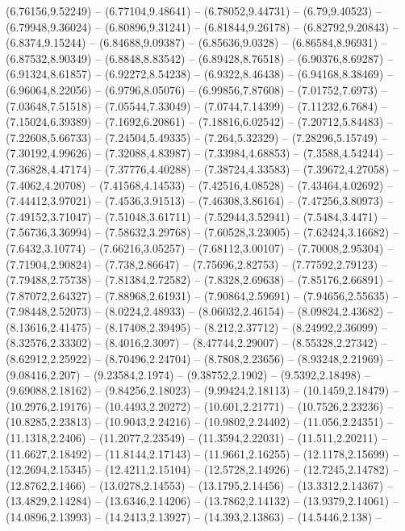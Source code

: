  (6.76156,9.52249) -- (6.77104,9.48641) -- (6.78052,9.44731) -- (6.79,9.40523) -- (6.79948,9.36024) -- (6.80896,9.31241) -- (6.81844,9.26178) -- (6.82792,9.20843) -- (6.8374,9.15244) -- (6.84688,9.09387) -- (6.85636,9.0328) -- (6.86584,8.96931) --
 (6.87532,8.90349) -- (6.8848,8.83542) -- (6.89428,8.76518) -- (6.90376,8.69287) -- (6.91324,8.61857) -- (6.92272,8.54238) -- (6.9322,8.46438) -- (6.94168,8.38469) -- (6.96064,8.22056) -- (6.9796,8.05076) -- (6.99856,7.87608) -- (7.01752,7.6973) --
 (7.03648,7.51518) -- (7.05544,7.33049) -- (7.0744,7.14399) -- (7.11232,6.7684) -- (7.15024,6.39389) -- (7.1692,6.20861) -- (7.18816,6.02542) -- (7.20712,5.84483) -- (7.22608,5.66733) -- (7.24504,5.49335) -- (7.264,5.32329) -- (7.28296,5.15749) --
 (7.30192,4.99626) -- (7.32088,4.83987) -- (7.33984,4.68853) -- (7.3588,4.54244) -- (7.36828,4.47174) -- (7.37776,4.40288) -- (7.38724,4.33583) -- (7.39672,4.27058) -- (7.4062,4.20708) -- (7.41568,4.14533) -- (7.42516,4.08528) -- (7.43464,4.02692) --
 (7.44412,3.97021) -- (7.4536,3.91513) -- (7.46308,3.86164) -- (7.47256,3.80973) -- (7.49152,3.71047) -- (7.51048,3.61711) -- (7.52944,3.52941) -- (7.5484,3.4471) -- (7.56736,3.36994) -- (7.58632,3.29768) -- (7.60528,3.23005) -- (7.62424,3.16682) --
 (7.6432,3.10774) -- (7.66216,3.05257) -- (7.68112,3.00107) -- (7.70008,2.95304) -- (7.71904,2.90824) -- (7.738,2.86647) -- (7.75696,2.82753) -- (7.77592,2.79123) -- (7.79488,2.75738) -- (7.81384,2.72582) -- (7.8328,2.69638) -- (7.85176,2.66891) --
 (7.87072,2.64327) -- (7.88968,2.61931) -- (7.90864,2.59691) -- (7.94656,2.55635) -- (7.98448,2.52073) -- (8.0224,2.48933) -- (8.06032,2.46154) -- (8.09824,2.43682) -- (8.13616,2.41475) -- (8.17408,2.39495) -- (8.212,2.37712) -- (8.24992,2.36099) --
 (8.32576,2.33302) -- (8.4016,2.3097) -- (8.47744,2.29007) -- (8.55328,2.27342) -- (8.62912,2.25922) -- (8.70496,2.24704) -- (8.7808,2.23656) -- (8.93248,2.21969) -- (9.08416,2.207) -- (9.23584,2.1974) -- (9.38752,2.1902) -- (9.5392,2.18498) --
 (9.69088,2.18162) -- (9.84256,2.18023) -- (9.99424,2.18113) -- (10.1459,2.18479) -- (10.2976,2.19176) -- (10.4493,2.20272) -- (10.601,2.21771) -- (10.7526,2.23236) -- (10.8285,2.23813) -- (10.9043,2.24216) -- (10.9802,2.24402) -- (11.056,2.24351) --
 (11.1318,2.2406) -- (11.2077,2.23549) -- (11.3594,2.22031) -- (11.511,2.20211) -- (11.6627,2.18492) -- (11.8144,2.17143) -- (11.9661,2.16255) -- (12.1178,2.15699) -- (12.2694,2.15345) -- (12.4211,2.15104) -- (12.5728,2.14926) -- (12.7245,2.14782) --
 (12.8762,2.1466) -- (13.0278,2.14553) -- (13.1795,2.14456) -- (13.3312,2.14367) -- (13.4829,2.14284) -- (13.6346,2.14206) -- (13.7862,2.14132) -- (13.9379,2.14061) -- (14.0896,2.13993) -- (14.2413,2.13927) -- (14.393,2.13863) -- (14.5446,2.138) --

